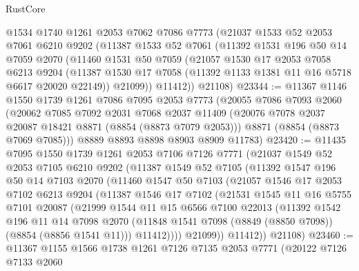 \begin{lexlean}{RustCore}
\begin{coremodule}
    @1534
    @1740
    @1261
    @2053
    @7062
    @7086
    @7773
    (@21037
      @1533
      @52
      @2053
      @7061
      @6210
      @9202
      (@11387
        @1533
        @52
        @7061
        (@11392
          @1531
          @196
          @50
          @14
          @7059
          @2070
          (@11460
            @1531
            @50
            @7059
            (@21057
              @1530
              @17
              @2053
              @7058
              @6213
              @9204
              (@11387 @1530 @17 @7058 (@11392 @1133 @1381 @11 @16 @5718 @6617 @20020 @22149))
              @21099))
          @11412))
      @21108)
@23344 := @11367
    @1146
    @1550
    @1739
    @1261
    @7086
    @7095
    @2053
    @7773
    (@20055
      @7086
      @7093
      @2060
      (@20062
        @7085
        @7092
        @2031
        @7068
        @2037
        @11409
        (@20076 @7078 @2037 @20087 @18421 @8871 (@8854 (@8873 @7079 @2053)))
        @8871
        (@8854 (@8873 @7069 @7085)))
      @8889
      @8893
      @8898
      @8903
      @8909
      @11783)
@23420 := @11435
    @7095
    @1550
    @1739
    @1261
    @2053
    @7106
    @7126
    @7771
    (@21037
      @1549
      @52
      @2053
      @7105
      @6210
      @9202
      (@11387
        @1549
        @52
        @7105
        (@11392
          @1547
          @196
          @50
          @14
          @7103
          @2070
          (@11460
            @1547
            @50
            @7103
            (@21057
              @1546
              @17
              @2053
              @7102
              @6213
              @9204
              (@11387
                @1546
                @17
                @7102
                (@21531
                  @1545
                  @11
                  @16
                  @5755
                  @7101
                  @20087
                  (@21999
                    @1544
                    @11
                    @15
                    @6566
                    @7100
                    @22013
                    (@11392
                      @1542
                      @196
                      @11
                      @14
                      @7098
                      @2070
                      (@11848 @1541 @7098 (@8849 (@8850 @7098)) (@8854 (@8856 @1541 @11)))
                      @11412))))
              @21099))
          @11412))
      @21108)
@23460 := @11367
    @1155
    @1566
    @1738
    @1261
    @7126
    @7135
    @2053
    @7771
    (@20122
      @7126
      @7133
      @2060

\end{coremodule}
\end{lexlean}
